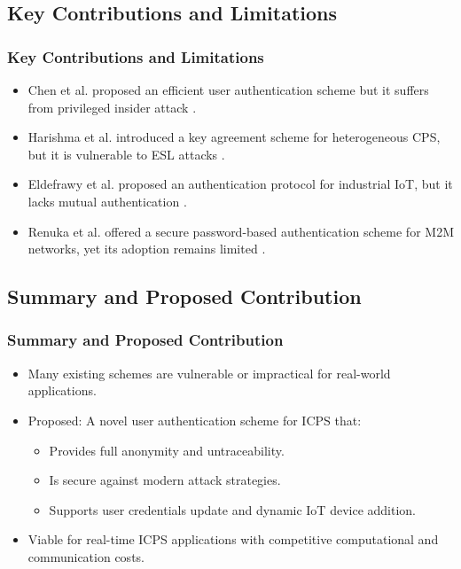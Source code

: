 \documentclass[9pt,handout]{beamer}
\begin{document}
\subsection{Key Contributions and Limitations}
\begin{frame}

\frametitle{Key Contributions and Limitations}

\begin{itemize}
    \item Chen et al. proposed an efficient user authentication scheme but it suffers from privileged insider attack \cite{Chen2017}.
    \item Harishma et al. introduced a key agreement scheme for heterogeneous CPS, but it is vulnerable to ESL attacks \cite{Harishma2018}.
    \item Eldefrawy et al. proposed an authentication protocol for industrial IoT, but it lacks mutual authentication \cite{Eldefrawy2019}.
    \item Renuka et al. offered a secure password-based authentication scheme for M2M networks, yet its adoption remains limited \cite{Renuka2019}.
\end{itemize}

\end{frame}
\subsection{Summary and Proposed Contribution}
\begin{frame}
\frametitle{Summary and Proposed Contribution}

\begin{itemize}
    \item Many existing schemes are vulnerable or impractical for real-world applications.
    \item Proposed: A novel user authentication scheme for ICPS that:
    \begin{itemize}
        \item Provides full anonymity and untraceability.
        \item Is secure against modern attack strategies.
        \item Supports user credentials update and dynamic IoT device addition.
    \end{itemize}
    \item Viable for real-time ICPS applications with competitive computational and communication costs.
\end{itemize}

\end{frame}
\end{document}
